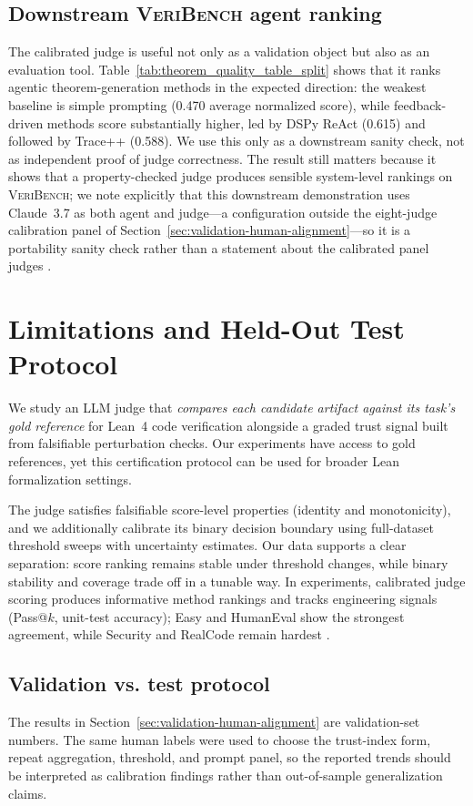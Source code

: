 \documentclass{article}
\begin{document}
\subsection{Downstream \textsc{VeriBench} agent ranking}
The calibrated judge is useful not only as a validation object but also as an evaluation tool. Table~\ref{tab:theorem_quality_table_split} shows that it ranks agentic theorem-generation methods in the expected direction: the weakest baseline is simple prompting (0.470 average normalized score), while feedback-driven methods score substantially higher, led by DSPy ReAct (0.615) and followed by Trace++ (0.588). We use this only as a downstream sanity check, not as independent proof of judge correctness. The result still matters because it shows that a property-checked judge produces sensible system-level rankings on \textsc{VeriBench}; we note explicitly that this downstream demonstration uses Claude~3.7 as both agent and judge---a configuration outside the eight-judge calibration panel of Section~\ref{sec:validation-human-alignment}---so it is a portability sanity check rather than a statement about the calibrated panel judges \citep{khattab2024dspy,cheng2024trace,chen2021evaluating}.

\section{Limitations and Held-Out Test Protocol}
We study an LLM judge that \emph{compares each candidate artifact against its task's gold reference} for Lean~4 code verification alongside a graded trust signal built from falsifiable perturbation checks. Our experiments have access to gold references, yet this certification protocol can be used for broader Lean formalization settings.

The judge satisfies falsifiable score-level properties (identity and monotonicity), and we additionally calibrate its binary decision boundary using full-dataset threshold sweeps with uncertainty estimates.
Our data supports a clear separation: score ranking remains stable under threshold changes, while binary stability and coverage trade off in a tunable way.
In experiments, calibrated judge scoring produces informative method rankings and tracks engineering signals (Pass@$k$, unit-test accuracy); Easy and HumanEval show the strongest agreement, while Security and RealCode remain hardest \citep{chen2021evaluating}.

\subsection{Validation vs. test protocol}\label{sec:val-vs-test}
The results in Section~\ref{sec:validation-human-alignment} are validation-set numbers. The same human labels were used to choose the trust-index form, repeat aggregation, threshold, and prompt panel, so the reported trends should be interpreted as calibration findings rather than out-of-sample generalization claims.
\end{document}
